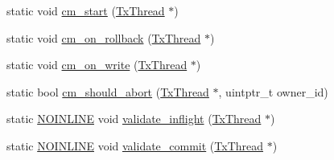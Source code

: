 \begin{DoxyCompactItemize}
static void \hyperlink{structanonymous__namespace_02swiss_8cpp_03_1_1Swiss_ab3d69809d60f42a83f71b979cdb882a4}{cm\-\_\-start} (\hyperlink{structstm_1_1TxThread}{Tx\-Thread} $\ast$)
\item 
static void \hyperlink{structanonymous__namespace_02swiss_8cpp_03_1_1Swiss_a911d79b2c722b891f4bc66b87d9351f3}{cm\-\_\-on\-\_\-rollback} (\hyperlink{structstm_1_1TxThread}{Tx\-Thread} $\ast$)
\item 
static void \hyperlink{structanonymous__namespace_02swiss_8cpp_03_1_1Swiss_a6a21cdf18e6d448f41087d57bf6ff35c}{cm\-\_\-on\-\_\-write} (\hyperlink{structstm_1_1TxThread}{Tx\-Thread} $\ast$)
\item 
static bool \hyperlink{structanonymous__namespace_02swiss_8cpp_03_1_1Swiss_aca0dca47a907ca855dec63988eb02167}{cm\-\_\-should\-\_\-abort} (\hyperlink{structstm_1_1TxThread}{Tx\-Thread} $\ast$, uintptr\-\_\-t owner\-\_\-id)
\item 
static \hyperlink{platform_8hpp_a1b173d22e57d9395897acbd8de62d505}{N\-O\-I\-N\-L\-I\-N\-E} void \hyperlink{structanonymous__namespace_02swiss_8cpp_03_1_1Swiss_acff1b28d7c75925e2b7981f4f6685710}{validate\-\_\-inflight} (\hyperlink{structstm_1_1TxThread}{Tx\-Thread} $\ast$)
\item 
static \hyperlink{platform_8hpp_a1b173d22e57d9395897acbd8de62d505}{N\-O\-I\-N\-L\-I\-N\-E} void \hyperlink{structanonymous__namespace_02swiss_8cpp_03_1_1Swiss_a44ccef93251245adb984032b970d983e}{validate\-\_\-commit} (\hyperlink{structstm_1_1TxThread}{Tx\-Thread} $\ast$)
\end{DoxyCompactItemize}


